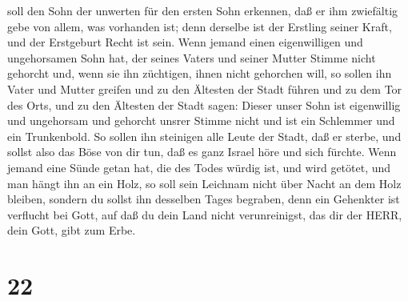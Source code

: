 soll den Sohn der unwerten für den ersten Sohn erkennen, daß er ihm
zwiefältig gebe von allem, was vorhanden ist; denn derselbe ist der
Erstling seiner Kraft, und der Erstgeburt Recht ist sein. 
Wenn jemand einen eigenwilligen und ungehorsamen Sohn hat, der seines
Vaters und seiner Mutter Stimme nicht gehorcht und, wenn sie ihn
züchtigen, ihnen nicht gehorchen will,  so sollen ihn Vater
und Mutter greifen und zu den Ältesten der Stadt führen und zu dem Tor
des Orts,  und zu den Ältesten der Stadt sagen: Dieser
unser Sohn ist eigenwillig und ungehorsam und gehorcht unsrer Stimme
nicht und ist ein Schlemmer und ein Trunkenbold.  So sollen
ihn steinigen alle Leute der Stadt, daß er sterbe, und sollst also das
Böse von dir tun, daß es ganz Israel höre und sich fürchte.
 Wenn jemand eine Sünde getan hat, die des Todes würdig
ist, und wird getötet, und man hängt ihn an ein Holz,  so
soll sein Leichnam nicht über Nacht an dem Holz bleiben, sondern du
sollst ihn desselben Tages begraben, denn ein Gehenkter ist verflucht
bei Gott, auf daß du dein Land nicht verunreinigst, das dir der HERR,
dein Gott, gibt zum Erbe.

\hypertarget{section-21}{%
\section{22}\label{section-21}}

